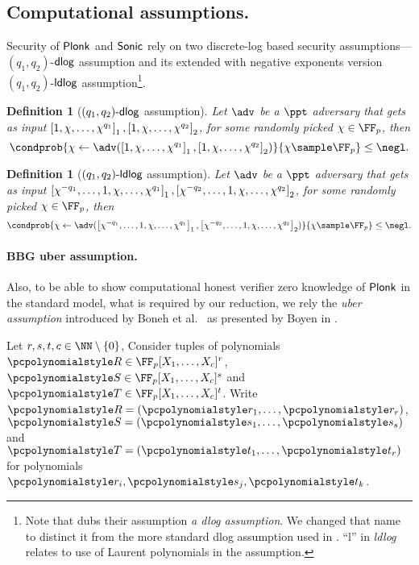 \let\accentvec\vec \documentclass[runningheads,10pt]{llncs}
\newtheorem{definition}[theorem]{Definition}
\begin{document}
\subsection{Computational assumptions.}
Security of $\textnormal{\textsf{Plonk}}$ and ${\textnormal{\textsf{Sonic}}}$ rely on two discrete-log based security
assumptions---$(q_1, q_2)$-$\mathsf{dlog}$ assumption and its extended with
negative exponents version $(q_1,
q_2)$-$\mathsf{ldlog}$ assumption\footnote{Note that \cite{CCS:MBKM19} dubs their
	assumption \emph{a dlog assumption}. We changed that name to distinct it
from the more standard dlog assumption used in \cite{EPRINT:GabWilCio19}.
``l'' in \emph{ldlog} relates to use of Laurent polynomials in the assumption.}.
\begin{definition}[$(q_1, q_2)\text{-}\mathsf{dlog}$ assumption]
	Let $\adv$ be a $\ppt$ adversary that gets as input $\left[1, \chi, \ldots, \chi^{q_1}\right]_{1}, \left[1, \chi, \ldots, \chi^{q_2}\right]_{2}$, for some randomly picked $\chi \in \FF_p$, then
	\[
		\condprob{\chi \gets \adv(\gone{1, \chi, \ldots, \chi^{q_1}}, \gtwo{1, \chi, \ldots, \chi^{q_2} })}{\chi \sample \FF_p} \leq \negl.
	\]
\end{definition}

\begin{definition}[$(q_1, q_2)\text{-}\mathsf{ldlog}$ assumption]
		Let $\adv$ be a $\ppt$ adversary that gets as input $\left[\chi^{-q_1},
		\ldots, 1, \chi, \ldots, \chi^{q_1}\right]_{1}, \left[\chi^{-q_2}, \ldots, 1, \chi, \ldots, \chi^{q_2}\right]_{2}$, for some randomly picked $\chi \in \FF_p$, then
	\[
			\condprob{\chi \gets \adv(\gone{\chi^{-q_1}, \ldots, 1, \chi, \ldots,
			\chi^{q_1}}, \gtwo{\chi^{-q_2}, \ldots, 1, \chi, \ldots, \chi^{q_2} })}{\chi \sample \FF_p} \leq \negl.
	\]
\end{definition}

\paragraph{BBG uber assumption.}
Also, to be able to show computational honest verifier zero knowledge of
$\textnormal{\textsf{Plonk}}$ in the standard model, what is required by our reduction, we rely the
\emph{uber assumption} introduced by Boneh et
al.~\cite{EC:BonBoyGoh05} as presented by Boyen in \cite{PAIRING:Boyen08}.

Let $r, s, t, c \in \NN \setminus \smallset{0}$, Consider tuples of
polynomials $\pR
\in \FF_p[X_1, \ldots, X_c]^r$, $\pS \in \FF_p[X_1, \ldots, X_c]^s$ and
$\pT 
\in \FF_p[X_1, \ldots, X_c]^t$. Write $\pR = \left( \p{r}_1, \ldots,
\p{r}_r \right)$,
$\pS = \left( \p{s}_1, \ldots, \p{s}_s \right)$ and $\pT = \left( \p{t}_1, \ldots,
\p{t}_r \right)$ for polynomials $\p{r}_i, \p{s}_j, \p{t}_k$. 
\end{document}
